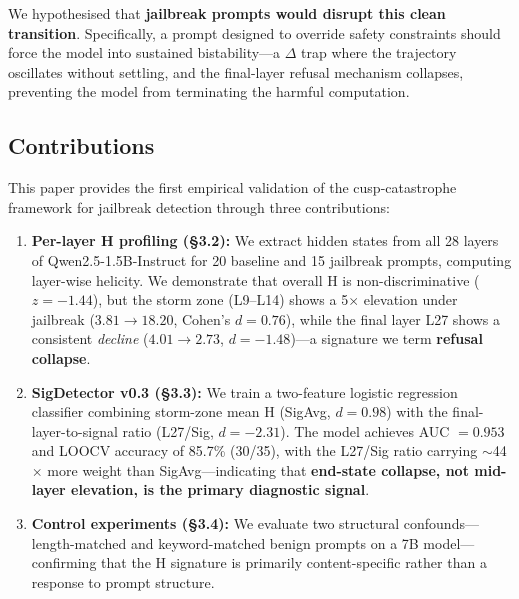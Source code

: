 \documentclass[12pt,a4paper]{article}
\begin{document}
We hypothesised that \textbf{jailbreak prompts would disrupt this clean transition}. Specifically, a prompt designed to override safety constraints should force the model into sustained bistability---a $\Delta$ trap where the trajectory oscillates without settling, and the final-layer refusal mechanism collapses, preventing the model from terminating the harmful computation.

\subsection{Contributions}

This paper provides the first empirical validation of the cusp-catastrophe framework for jailbreak detection through three contributions:

\begin{enumerate}[leftmargin=*]
    \item \textbf{Per-layer H profiling (§3.2):} We extract hidden states from all 28 layers of Qwen2.5-1.5B-Instruct for 20 baseline and 15 jailbreak prompts, computing layer-wise helicity. We demonstrate that overall H is non-discriminative ($z = -1.44$), but the storm zone (L9--L14) shows a 5$\times$ elevation under jailbreak ($3.81 \rightarrow 18.20$, Cohen's $d = 0.76$), while the final layer L27 shows a consistent \textit{decline} ($4.01 \rightarrow 2.73$, $d = -1.48$)---a signature we term \textbf{refusal collapse}.
    
    \item \textbf{SigDetector v0.3 (§3.3):} We train a two-feature logistic regression classifier combining storm-zone mean H (SigAvg, $d = 0.98$) with the final-layer-to-signal ratio (L27/Sig, $d = -2.31$). The model achieves AUC $= 0.953$ and LOOCV accuracy of 85.7\% (30/35), with the L27/Sig ratio carrying $\sim$44$\times$ more weight than SigAvg---indicating that \textbf{end-state collapse, not mid-layer elevation, is the primary diagnostic signal}.
    
    \item \textbf{Control experiments (§3.4):} We evaluate two structural confounds---length-matched and keyword-matched benign prompts on a 7B model---confirming that the H signature is primarily content-specific rather than a response to prompt structure.
\end{enumerate}

\end{document}

